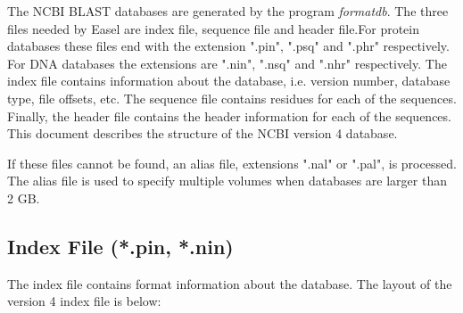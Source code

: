 
The NCBI BLAST databases are generated by the program \emph{formatdb}.
The three files needed by Easel are index file, sequence file 
and header file.For protein databases these files end with the extension 
".pin", ".psq" and ".phr" respectively.  For DNA databases the 
extensions are ".nin", ".nsq" and ".nhr" respectively.  The index 
file contains information about the database, i.e. version number, 
database type, file offsets, etc.  The sequence file contains residues
for each of the sequences.  Finally, the header file contains the header 
information for each of the sequences.  This document describes the
structure of the NCBI version 4 database.

If these files cannot be found, an alias file, extensions ".nal" or
 ".pal", is processed.  The alias file is used to specify multiple
volumes when databases are larger than 2 GB.


\subsection{Index File (*.pin, *.nin)}

The index file contains format information about the database.   The 
layout of the version 4 index file is below:

